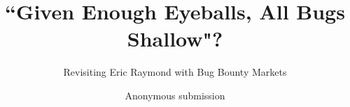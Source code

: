 \documentclass[runningheads]{llncs}
\begin{document}
\title{\large ``Given Enough Eyeballs, All Bugs Shallow"?}
\subtitle{Revisiting Eric Raymond with Bug Bounty Markets}

\author{Anonymous submission}
\date{}

\maketitle

\begin{abstract}

\end{abstract}











\clearpage

\end{document}
